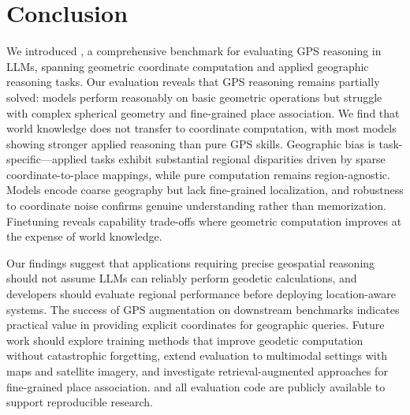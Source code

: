\section{Conclusion}
\label{sec:conclusion}

We introduced \dsName, a comprehensive benchmark for evaluating GPS reasoning in LLMs, spanning geometric coordinate computation and applied geographic reasoning tasks. Our evaluation reveals that GPS reasoning remains partially solved: models perform reasonably on basic geometric operations but struggle with complex spherical geometry and fine-grained place association. We find that world knowledge does not transfer to coordinate computation, with most models showing stronger applied reasoning than pure GPS skills. Geographic bias is task-specific---applied tasks exhibit substantial regional disparities driven by sparse coordinate-to-place mappings, while pure computation remains region-agnostic. Models encode coarse geography but lack fine-grained localization, and robustness to coordinate noise confirms genuine understanding rather than memorization. Finetuning reveals capability trade-offs where geometric computation improves at the expense of world knowledge.

Our findings suggest that applications requiring precise geospatial reasoning should not assume LLMs can reliably perform geodetic calculations, and developers should evaluate regional performance before deploying location-aware systems. The success of GPS augmentation on downstream benchmarks indicates practical value in providing explicit coordinates for geographic queries. Future work should explore training methods that improve geodetic computation without catastrophic forgetting, extend evaluation to multimodal settings with maps and satellite imagery, and investigate retrieval-augmented approaches for fine-grained place association. \dsName and all evaluation code are publicly available to support reproducible research.
